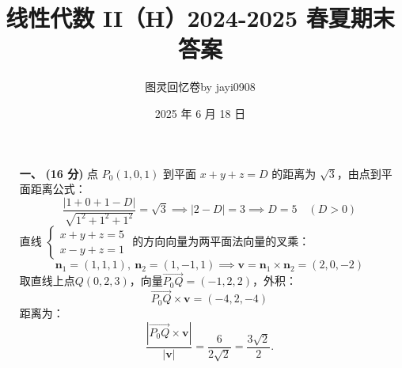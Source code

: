 \documentclass{ctexart}
\title{\vspace{-4em}\textbf{线性代数 II（H）2024-2025 春夏期末答案}}
\author{图灵回忆卷\quad\quad by jayi0908}
\date{2025 年 6 月 18 日}
\begin{document}
\maketitle

\begin{enumerate}
    \item[\textbf{一、}] \textbf{(16 分)} 点 \(P_0(1,0,1)\) 到平面 \(x+y+z=D\) 的距离为 \(\sqrt{3}\)，由点到平面距离公式：
    \[
    \frac{|1+0+1-D|}{\sqrt{1^2+1^2+1^2}} = \sqrt{3} \implies |2-D|=3 \implies D=5 \quad(D>0)
    \]
    直线 \(\begin{cases}x+y+z=5 \\ x-y+z=1\end{cases}\) 的方向向量为两平面法向量的叉乘：
    \[
    \boldsymbol{n}_1=(1,1,1),\ \boldsymbol{n}_2=(1,-1,1) \implies \boldsymbol{v}=\boldsymbol{n}_1\times\boldsymbol{n}_2=(2,0,-2)
    \]
    取直线上点\(Q(0,2,3)\)，向量\(\overrightarrow{P_0Q}=(-1,2,2)\)，外积：
    \[ \overrightarrow{P_0Q}\times\boldsymbol{v}=(-4,2,-4) \]
    距离为：
    \[
    \frac{|\overrightarrow{P_0Q}\times\boldsymbol{v}|}{|\boldsymbol{v}|} = \frac{6}{2\sqrt{2}} = \frac{3\sqrt{2}}{2}.
    \]


\end{enumerate}
\end{document}
